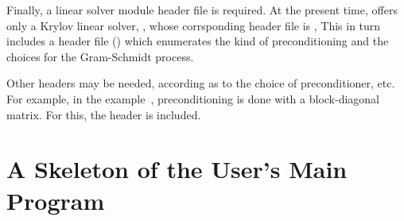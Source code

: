 Finally, a linear solver module header file is required. 
At the present time, {\kinsol} offers only a Krylov linear solver, {\kinspgmr},
whose corrsponding header file is , 
This in turn includes a header file ()
which enumerates the kind of preconditioning and the choices for the
Gram-Schmidt process.

Other headers may be needed, according as to the choice of
preconditioner, etc. For example, in the  example~\cite{kinsol2.2.0_ex}, 
preconditioning is done with a block-diagonal matrix. For this, the header
 is included.

\section{A Skeleton of the User's Main Program}\label{s:skeleton_sol}

